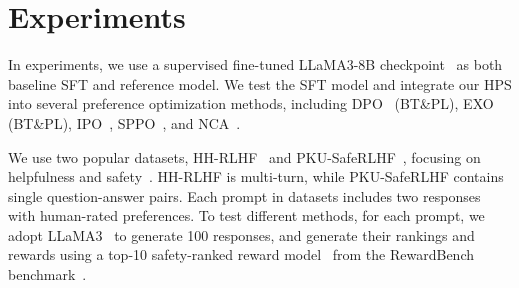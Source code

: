 




 
\vspace{-7pt}
\section{Experiments}
\vspace{-2pt}
\label{sec:experiments}
%


 In experiments, we use a supervised fine-tuned LLaMA3-8B checkpoint~\cite{onlinerlhf,llama3} as both  baseline SFT and reference model. We test the SFT model and integrate our HPS into several preference optimization methods, including DPO~\cite{dpo} (BT\&PL), EXO~\cite{exo} (BT\&PL), IPO~\cite{ipo}, SPPO~\cite{sppo}, and NCA~\cite{nca}. 

\vspace{-1pt}

 We use two popular datasets, HH-RLHF~\cite{hhdata} and PKU-SafeRLHF~\cite{pkusafe},  focusing on helpfulness and safety~\cite{RewardBench, llmbench}. HH-RLHF is multi-turn, while PKU-SafeRLHF contains single question-answer pairs. Each prompt in datasets includes two responses with human-rated preferences. To test different methods, for each prompt, we adopt LLaMA3~\cite{onlinerlhf} to generate 100  responses, and generate their rankings and rewards  using a top-10 safety-ranked reward model~\cite{liu2024skywork} from the RewardBench benchmark~\cite{RewardBench}.

